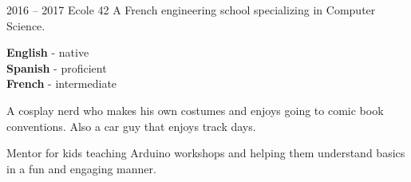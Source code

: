 \documentclass[10pt]{developercv} %
\begin{document}
\begin{entrylist}
	\entry
		{2016 -- 2017}
		{Ecole 42}
		{A French engineering school specializing in Computer Science.}

\end{entrylist}


\begin{minipage}[t]{0.3\textwidth}
	\vspace{-\baselineskip} %
	
	\textbf{English} - native\\
	\textbf{Spanish} - proficient\\
	\textbf{French} - intermediate
\end{minipage}
\hfill
\begin{minipage}[t]{0.3\textwidth}
	\vspace{-\baselineskip} %
	
	\footnotesize A cosplay nerd who makes his own costumes and enjoys going
	to comic book conventions. Also a car guy that enjoys track days.
\end{minipage}
\hfill
\begin{minipage}[t]{0.3\textwidth}
	\vspace{-\baselineskip} %

	\footnotesize Mentor for kids teaching Arduino workshops and helping them understand
	basics in a fun and engaging manner.
\end{minipage}

\end{document}
